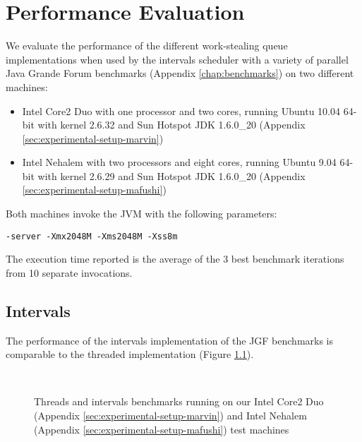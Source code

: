 
\chapter{Performance Evaluation}
\label{chap:queues-performance}

We evaluate the performance of the different work-stealing queue
implementations when used by the intervals scheduler with a variety of
parallel Java Grande Forum benchmarks (Appendix \ref{chap:benchmarks})
on two different machines:

\begin{itemize}
\item Intel Core2 Duo with one processor and two cores, running Ubuntu
  10.04 64-bit with kernel 2.6.32 and Sun Hotspot JDK 1.6.0\_20
  (Appendix \ref{sec:experimental-setup-marvin})
\item Intel Nehalem with two processors and eight cores, running
  Ubuntu 9.04 64-bit with kernel 2.6.29 and Sun Hotspot JDK 1.6.0\_20
  (Appendix \ref{sec:experimental-setup-mafushi})
\end{itemize}

Both machines invoke the JVM with the following parameters:

\begin{lstlisting}[style=Listing]
  -server -Xmx2048M -Xms2048M -Xss8m
\end{lstlisting}

The execution time reported is the average of the 3 best benchmark
iterations from 10 separate invocations.


\section{Intervals}
\label{sec:queues-performance-intervals}

The performance of the intervals implementation of the JGF benchmarks
is comparable to the threaded implementation (Figure
\ref{fig:queues-performance-threads}).

\begin{figure}[!ht]
  \centering
  \\
  \caption[Threads and intervals benchmark results]{Threads and
    intervals benchmarks running on our Intel Core2 Duo (Appendix
    \ref{sec:experimental-setup-marvin}) and Intel Nehalem (Appendix
    \ref{sec:experimental-setup-mafushi}) test machines}
  \label{fig:queues-performance-threads}
\end{figure}

